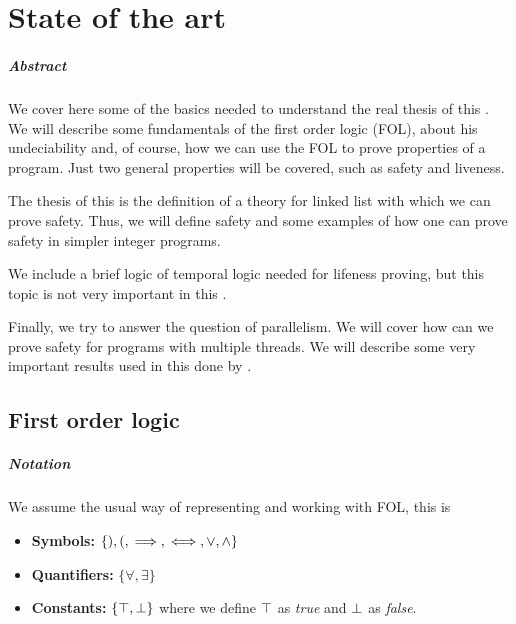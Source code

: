 \chapter{State of the art\label{sec:estado_del_arte}}

\paragraph{Abstract}

We cover here some of the basics needed to understand the real thesis of this \thisworkm. We will describe some fundamentals of the first order logic (\gls{FOL}), about his undeciability and, of course, how we can use the \gls{FOL} to prove properties of a program. Just two general properties will be covered, such as safety and liveness.

The thesis of this \thisworkm is the definition of a theory for linked list with which we can prove safety. Thus, we will define safety and some examples of how one can prove safety in simpler integer programs.

We include a brief logic of temporal logic needed for lifeness proving, but this topic is not very important in this \thisworkm.

Finally, we try to answer the question of parallelism. We will cover how can we prove safety for programs with multiple threads. We will describe some very important results used in this \thisworkm 
done by \citep{thesisAle}.

\section{First order logic}

\paragraph{Notation}
\label{def:notation}
We assume the usual way of representing and working with \gls{FOL}, this is
\begin{itemize}
	\item \textbf{Symbols:} $\{),(, \implies, \iff, \vee , \wedge \}$
	\item \textbf{Quantifiers:} $\{\forall, \exists\}$
	\item \textbf{Constants:} $\{\top,\perp\}$
	where we define $\top$ as \textit{true} and $\perp$ as \textit{false}.
\end{itemize}

